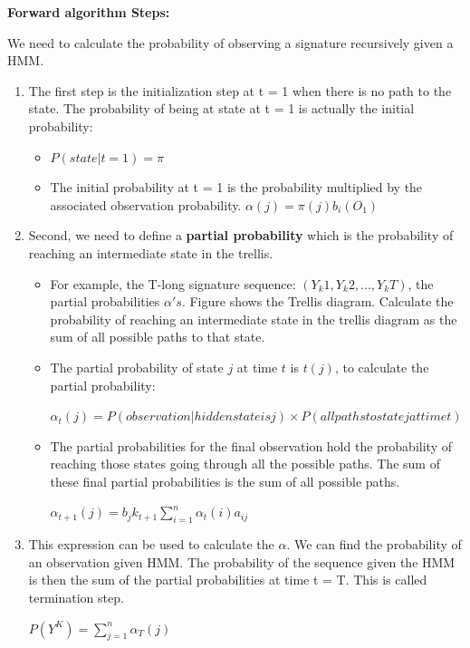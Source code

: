 \textbf{Forward algorithm Steps:}

We need to calculate the probability of observing a signature recursively given a HMM. 

\begin{enumerate}

\item The first step is the initialization step at t = 1 when there is no path to the state. The probability of being at state at t = 1 is actually the initial probability:
\begin{itemize}


 \item $P (state | t = 1) = \pi $
\item The initial probability at t = 1 is the probability multiplied by the associated observation probability.
$\alpha(j) = \pi(j) b_i (O_1)$
\end{itemize}

\item Second, we need to define a \textbf{partial probability} which is the probability of reaching an intermediate state in the trellis.

\begin{itemize}

\item For example, the T-long signature sequence: $(Y_k1, Y_k2,..., Y_kT)$, the partial probabilities $\alpha 's$. Figure shows the Trellis diagram. Calculate the probability of reaching an intermediate state in the trellis diagram as the sum of all possible paths to that state.

\item The partial probability of state $j$ at time $t$ is $t(j)$, to calculate the partial probability:

$\alpha_t(j) = P (observation | hidden state is j) \times P (all paths to state j at time t)$

\item The partial probabilities for the final observation hold the probability of reaching those states going through all the possible paths. The sum of these final partial probabilities is the sum of all possible paths. 

\hspace {4.5 cm}$\alpha_{t+1}(j) = b_jk_{t+1} \sum\limits^{n}_{i = 1} \alpha_t(i) a_{ij}$




\end{itemize}
\item This expression can be used to calculate the $\alpha$. We can find the probability of an observation given HMM. The probability of the sequence given the HMM is then the sum of the partial probabilities at time t = T. This is called termination step.
 
 \hspace {4.5 cm}$P(Y^K) = \sum\limits^{n}_{j=1} \alpha_T (j)$

\end{enumerate}







